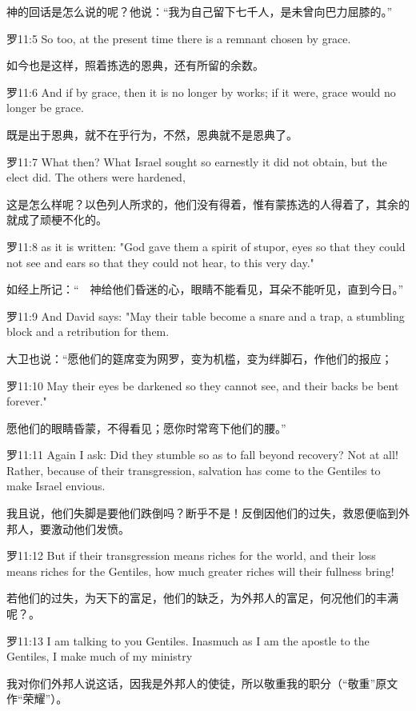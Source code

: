 \documentclass[a4paper,11pt,onecolumn,twoside]{ctexart}
\begin{document}
\begin{multicols}{2}
 神的回话是怎么说的呢？他说：“我为自己留下七千人，是未曾向巴力屈膝的。”


 罗11:5
 So too, at the present time there is a remnant chosen by grace.

 如今也是这样，照着拣选的恩典，还有所留的余数。


 罗11:6
 And if by grace, then it is no longer by works; if it were, grace would no longer be grace.

 既是出于恩典，就不在乎行为，不然，恩典就不是恩典了。


 罗11:7
 What then? What Israel sought so earnestly it did not obtain, but the elect did. The others were hardened,

 这是怎么样呢？以色列人所求的，他们没有得着，惟有蒙拣选的人得着了，其余的就成了顽梗不化的。


 罗11:8
 as it is written: "God gave them a spirit of stupor, eyes so that they could not see and ears so that they could not hear, to this very day."

 如经上所记：“　神给他们昏迷的心，眼睛不能看见，耳朵不能听见，直到今日。”


 罗11:9
 And David says: "May their table become a snare and a trap, a stumbling block and a retribution for them.

 大卫也说：“愿他们的筵席变为网罗，变为机槛，变为绊脚石，作他们的报应；


 罗11:10
 May their eyes be darkened so they cannot see, and their backs be bent forever."

 愿他们的眼睛昏蒙，不得看见；愿你时常弯下他们的腰。”


 罗11:11
 Again I ask: Did they stumble so as to fall beyond recovery? Not at all! Rather, because of their transgression, salvation has come to the Gentiles to make Israel envious.

 我且说，他们失脚是要他们跌倒吗？断乎不是！反倒因他们的过失，救恩便临到外邦人，要激动他们发愤。


 罗11:12
 But if their transgression means riches for the world, and their loss means riches for the Gentiles, how much greater riches will their fullness bring!

 若他们的过失，为天下的富足，他们的缺乏，为外邦人的富足，何况他们的丰满呢？。


 罗11:13
 I am talking to you Gentiles. Inasmuch as I am the apostle to the Gentiles, I make much of my ministry

 我对你们外邦人说这话，因我是外邦人的使徒，所以敬重我的职分（“敬重”原文作“荣耀”）。



\end{multicols}
\end{document}
